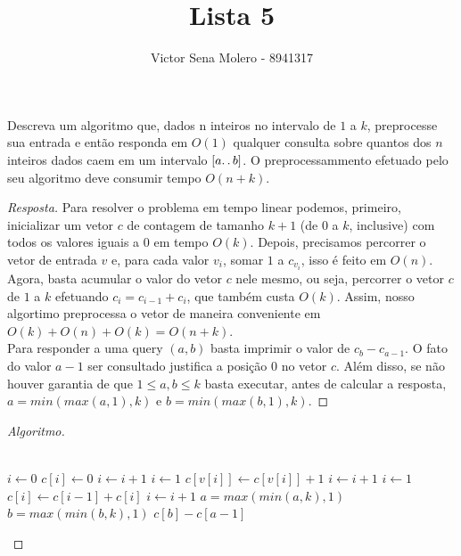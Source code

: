 \documentclass[12pt]{article}
\newenvironment{problem}[2][Ex]{\begin{trivlist}
\item[\hskip \labelsep {\bfseries #1}\hskip \labelsep {\bfseries #2.}]}{\end{trivlist}}
\begin{document}
 
 
\title{Lista 5}
\author{Victor Sena Molero - 8941317}
\maketitle
 
\begin{problem}{8}
Descreva um algoritmo que, dados n inteiros no intervalo de $1$ a $k$, preprocesse sua entrada e então responda em $O(1)$ qualquer consulta sobre quantos dos $n$ inteiros dados caem em um intervalo $[a \ldotp \ldotp b]$. O preprocessammento efetuado pelo seu algoritmo deve consumir tempo $O(n+k)$.
\end{problem}
 
\begin{proof}[Resposta]
Para resolver o problema em tempo linear podemos, primeiro, inicializar um vetor $c$ de contagem de tamanho $k+1$ (de $0$ a $k$, inclusive) com todos os valores iguais a $0$ em tempo $O(k)$. Depois, precisamos percorrer o vetor de entrada $v$ e, para cada valor $v_i$, somar $1$ a $c_{v_i}$, isso é feito em $O(n)$. \\
Agora, basta acumular o valor do vetor $c$ nele mesmo, ou seja, percorrer o vetor $c$ de $1$ a $k$ efetuando $c_i = c_{i-1} + c_i$, que também custa $O(k)$. Assim, nosso algortimo preprocessa o vetor de maneira conveniente em $O(k) + O(n) + O(k) = O(n+k)$. \\
Para responder a uma query $(a,b)$ basta imprimir o valor de $c_b - c_{a-1}$. O fato do valor $a-1$ ser consultado justifica a posição $0$ no vetor $c$. Além disso, se não houver garantia de que $1 \leq a,b \leq k$ basta executar, antes de calcular a resposta, $a = min(max(a, 1), k)$ e $b = min(max(b, 1), k)$.
\end{proof}

\begin{proof}[Algoritmo]
\begin{algorithmic}
\\
    \State $i \gets 0$
        \State $c[i] \gets 0$
        \State $i \gets i + 1$
    \EndWhile
    \State $i \gets 1$
        \State $c[v[i]] \gets c[v[i]] + 1$
        \State $i \gets i + 1$
    \EndWhile
    \State $i \gets 1$
        \State $c[i] \gets c[i-1] + c[i]$
        \State $i \gets i + 1$
    \EndWhile
\EndFunction
{}
    \State $a = \textit{max}(\textit{min}(a,k),1)$
    \State $b = \textit{max}(\textit{min}(b,k),1)$
    \State \Return $c[b] - c[a-1]$
\EndFunction
\end{algorithmic}
\end{proof}
\end{document}
